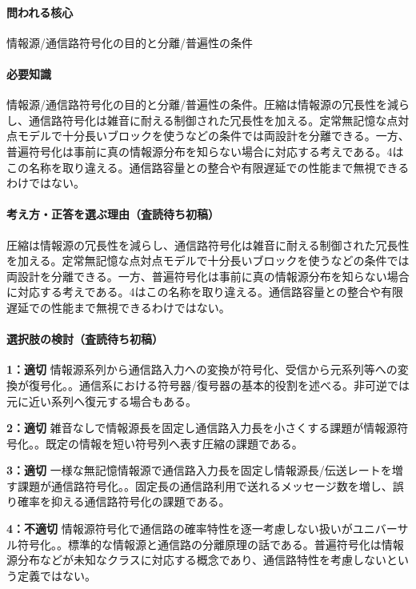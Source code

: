 \paragraph{問われる核心} 情報源/通信路符号化の目的と分離/普遍性の条件

\paragraph{必要知識} 情報源/通信路符号化の目的と分離/普遍性の条件。圧縮は情報源の冗長性を減らし、通信路符号化は雑音に耐える制御された冗長性を加える。定常無記憶な点対点モデルで十分長いブロックを使うなどの条件では両設計を分離できる。一方、普遍符号化は事前に真の情報源分布を知らない場合に対応する考えである。4はこの名称を取り違える。通信路容量との整合や有限遅延での性能まで無視できるわけではない。

\paragraph{考え方・正答を選ぶ理由（査読待ち初稿）} 圧縮は情報源の冗長性を減らし、通信路符号化は雑音に耐える制御された冗長性を加える。定常無記憶な点対点モデルで十分長いブロックを使うなどの条件では両設計を分離できる。一方、普遍符号化は事前に真の情報源分布を知らない場合に対応する考えである。4はこの名称を取り違える。通信路容量との整合や有限遅延での性能まで無視できるわけではない。

\paragraph{選択肢の検討（査読待ち初稿）}\mbox{}\par

\noindent\textbf{1：適切} 情報源系列から通信路入力への変換が符号化、受信から元系列等への変換が復号化。。通信系における符号器/復号器の基本的役割を述べる。非可逆では元に近い系列へ復元する場合もある。\par

\noindent\textbf{2：適切} 雑音なしで情報源長を固定し通信路入力長を小さくする課題が情報源符号化。。既定の情報を短い符号列へ表す圧縮の課題である。\par

\noindent\textbf{3：適切} 一様な無記憶情報源で通信路入力長を固定し情報源長/伝送レートを増す課題が通信路符号化。。固定長の通信路利用で送れるメッセージ数を増し、誤り確率を抑える通信路符号化の課題である。\par

\noindent\textbf{4：不適切} 情報源符号化で通信路の確率特性を逐一考慮しない扱いがユニバーサル符号化。。標準的な情報源と通信路の分離原理の話である。普遍符号化は情報源分布などが未知なクラスに対応する概念であり、通信路特性を考慮しないという定義ではない。\par

